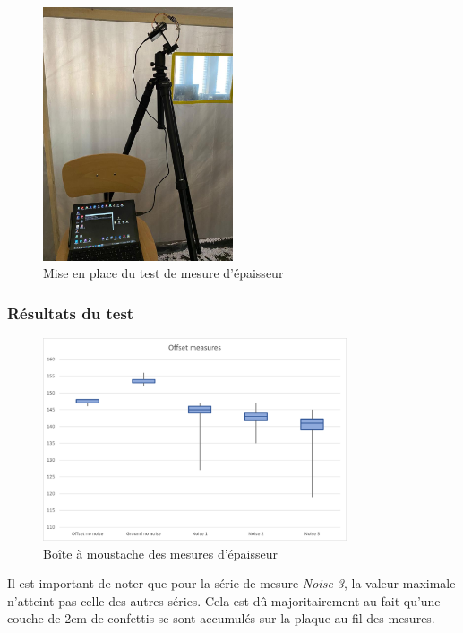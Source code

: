 \begin{figure}[H]
    \centering
    \includegraphics[width=0.5\textwidth]{Images/LiDAR/OffsetMes_InLab.jpeg}
    \caption{Mise en place du test de mesure d'épaisseur}
    \label{fig:OffsetMes_Labo}
\end{figure}

\subsubsection{Résultats du test}

\begin{figure}[H]
    \centering
    \includegraphics[width=0.8\textwidth]{Images/LiDAR/LiDAR_OffsetMes_Moustache.png}
    \caption{Boîte à moustache des mesures d'épaisseur}
    \label{fig:OffsetMes_Moustache}
\end{figure}

Il est important de noter que pour la série de mesure \emph{Noise 3}, la valeur maximale n'atteint
pas celle des autres séries. Cela est dû majoritairement au fait qu'une couche de 2cm de confettis
se sont accumulés sur la plaque au fil des mesures.


